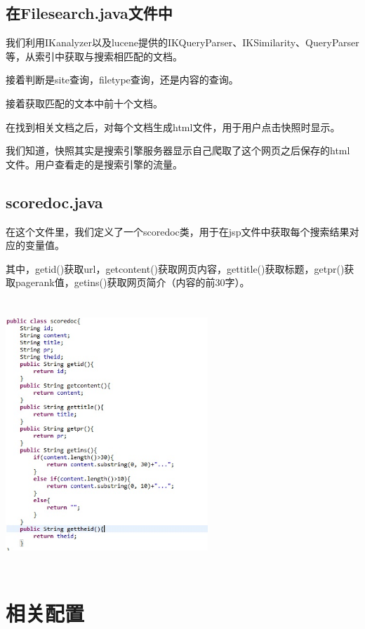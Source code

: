 ﻿\documentclass[UTF8]{ctexart}
\begin{document}
\begin{flushleft}
\subsection{在Filesearch.java文件中}
\par{}
    我们利用IKanalyzer以及lucene提供的IKQueryParser、IKSimilarity、QueryParser等，从索引中获取与搜索相匹配的文档。
\par{}
    接着判断是site查询，filetype查询，还是内容的查询。
\par{}
    接着获取匹配的文本中前十个文档。
\par{}
    在找到相关文档之后，对每个文档生成html文件，用于用户点击快照时显示。
\par{}
    我们知道，快照其实是搜索引擎服务器显示自己爬取了这个网页之后保存的html文件。用户查看走的是搜索引擎的流量。
\par{}
\subsection{scoredoc.java}
    在这个文件里，我们定义了一个scoredoc类，用于在jsp文件中获取每个搜索结果对应的变量值。
\par{}
    其中，getid()获取url，getcontent()获取网页内容，gettitle()获取标题，getpr()获取pagerank值，getins()获取网页简介（内容的前30字）。
\par{}
\includegraphics[width=3.00in,height=4.00in]{figure21.jpg}
\par{}
\section{相关配置}

\end{flushleft}
\end{document}
